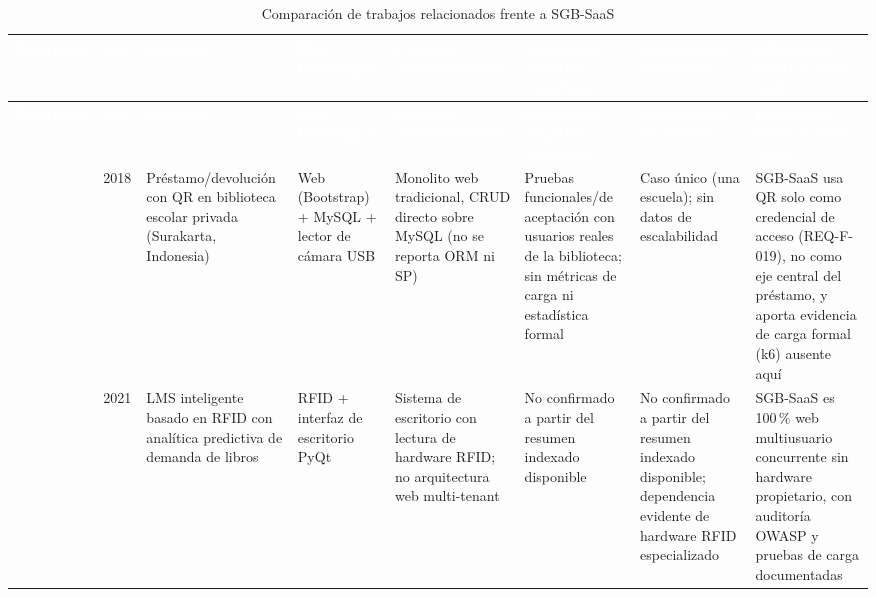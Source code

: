 \begin{landscape}
\begin{center}
\scriptsize
\renewcommand{\arraystretch}{1.15}
\setlength{\tabcolsep}{2pt}
\begin{longtable}{|p{2.0cm}|p{0.8cm}|p{2.5cm}|p{2.5cm}|p{2.8cm}|p{3.0cm}|p{2.8cm}|p{3.0cm}|}
\caption{Comparación de trabajos relacionados frente a SGB-SaaS}
\label{tab:trabajos-comparativa}\\
\hline
\rowcolor{verdeuteq}
\textcolor{white}{\textbf{Referencia}} & \textcolor{white}{\textbf{Año}} &
\textcolor{white}{\textbf{Dominio}} & \textcolor{white}{\textbf{Pila
tecnológica}} & \textcolor{white}{\textbf{Patrones arquitectónicos}} &
\textcolor{white}{\textbf{Evaluación empírica reportada}} &
\textcolor{white}{\textbf{Limitaciones declaradas}} &
\textcolor{white}{\textbf{Diferencia frente a SGB-SaaS}} \\
\hline
\endfirsthead
\hline
\rowcolor{verdeuteq}
\textcolor{white}{\textbf{Referencia}} & \textcolor{white}{\textbf{Año}} &
\textcolor{white}{\textbf{Dominio}} & \textcolor{white}{\textbf{Pila
tecnológica}} & \textcolor{white}{\textbf{Patrones arquitectónicos}} &
\textcolor{white}{\textbf{Evaluación empírica reportada}} &
\textcolor{white}{\textbf{Limitaciones declaradas}} &
\textcolor{white}{\textbf{Diferencia frente a SGB-SaaS}} \\
\hline
\endhead
\hline
\endfoot

\citet{supriyono2018qr} & 2018 &
Préstamo\allowbreak/devolución con QR en biblioteca escolar privada (Surakarta,
Indonesia) &
Web (Bootstrap) + MySQL + lector de cámara USB &
Monolito web tradicional, CRUD directo sobre MySQL (no se reporta ORM
ni SP) &
Pruebas funcionales/de aceptación con usuarios reales de la biblioteca;
sin métricas de carga ni estadística formal &
Caso único (una escuela); sin datos de escalabilidad &
SGB-SaaS usa QR solo como credencial de acceso (REQ-F-019), no como eje
central del préstamo, y aporta evidencia de carga formal (k6) ausente
aquí \\
\hline

\citet{mukund2021rfid} & 2021 &
LMS inteligente basado en RFID con analítica predictiva de demanda de
libros &
RFID + interfaz de escritorio PyQt &
Sistema de escritorio con lectura de hardware RFID; no arquitectura web
multi-tenant &
No confirmado a partir del resumen indexado disponible &
No confirmado a partir del resumen indexado disponible; dependencia
evidente de hardware RFID especializado &
SGB-SaaS es 100\,\% web multiusuario concurrente sin hardware
propietario, con auditoría OWASP y pruebas de carga documentadas \\
\hline


\end{longtable}
\end{center}
\end{landscape}
